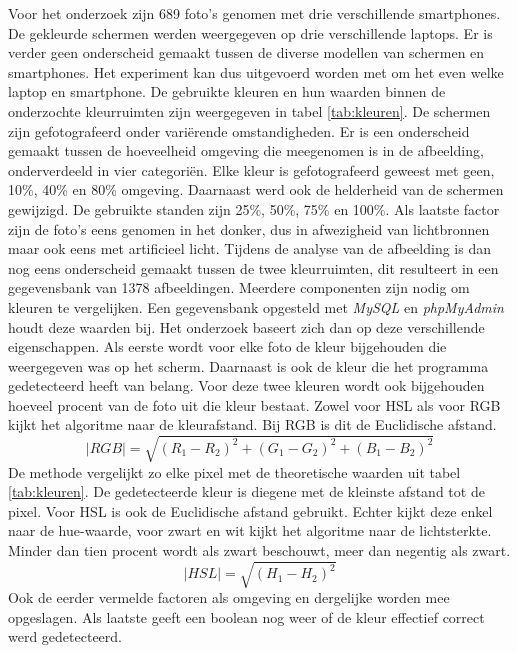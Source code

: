 Voor het onderzoek zijn 689 foto's genomen met drie verschillende smartphones. De gekleurde schermen werden weergegeven op drie verschillende laptops. Er is verder geen onderscheid gemaakt tussen de diverse modellen van schermen en smartphones. Het experiment kan dus uitgevoerd worden met om het even welke laptop en smartphone. De gebruikte kleuren en hun waarden binnen de onderzochte kleurruimten zijn weergegeven in tabel \ref{tab:kleuren}. De schermen zijn gefotografeerd onder variërende omstandigheden. Er is een onderscheid gemaakt tussen de hoeveelheid omgeving die meegenomen is in de afbeelding, onderverdeeld in vier categoriën. Elke kleur is gefotografeerd geweest met geen, 10\%, 40\% en 80\% omgeving. Daarnaast werd ook de helderheid van de schermen gewijzigd. De gebruikte standen zijn 25\%, 50\%, 75\% en 100\%. Als laatste factor zijn de foto's eens genomen in het donker, dus in afwezigheid van lichtbronnen maar ook eens met artificieel licht.  Tijdens de analyse van de afbeelding is dan nog eens onderscheid gemaakt tussen de twee kleurruimten, dit resulteert in een gegevensbank van 1378 afbeeldingen.  Meerdere componenten zijn nodig om kleuren te vergelijken. Een gegevensbank opgesteld met \textit{MySQL} en \textit{phpMyAdmin} houdt deze waarden bij. Het onderzoek baseert zich dan op deze verschillende eigenschappen. Als eerste wordt voor elke foto de kleur bijgehouden die weergegeven was op het scherm. Daarnaast is ook de kleur die het programma gedetecteerd heeft van belang. Voor deze twee kleuren wordt ook bijgehouden hoeveel procent van de foto uit die kleur bestaat. Zowel voor HSL als voor RGB kijkt het algoritme naar de kleurafstand. Bij RGB is dit de Euclidische afstand. 
$$ \mid RGB \mid = \sqrt{(R_1 - R_2)^2 + (G_1 - G_2)^2 + (B_1 - B_2)^2}$$
De methode vergelijkt zo elke pixel met de theoretische waarden uit tabel \ref{tab:kleuren}. De gedetecteerde kleur is diegene met de kleinste afstand tot de pixel. Voor HSL is ook de Euclidische afstand gebruikt. Echter kijkt deze enkel naar de hue-waarde, voor zwart en wit kijkt het algoritme naar de lichtsterkte. Minder dan tien procent wordt als zwart beschouwt, meer dan negentig als zwart. 
$$ \mid HSL \mid = \sqrt{(H_1 - H_2)^2 }$$
Ook de eerder vermelde factoren als omgeving en dergelijke worden mee opgeslagen. Als laatste geeft een boolean nog weer of de kleur effectief correct werd gedetecteerd.


